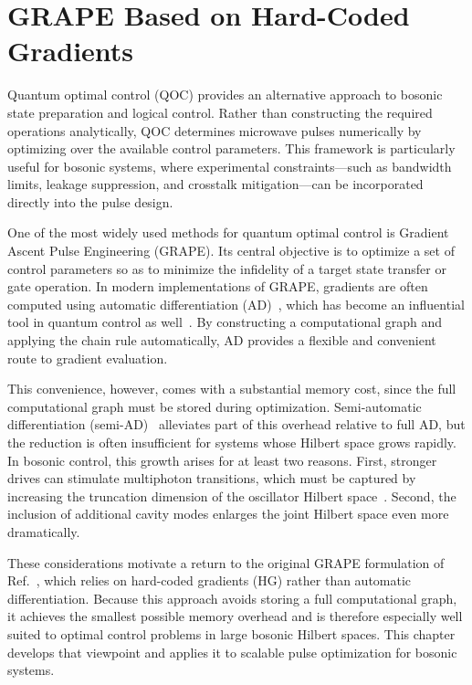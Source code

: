 \chapter{GRAPE Based on Hard-Coded Gradients}
\label{chap:grape}
Quantum optimal control (QOC) provides an alternative approach to bosonic state preparation and logical control. Rather than constructing the required operations analytically, QOC determines microwave pulses numerically by optimizing over the available control parameters. This framework is particularly useful for bosonic systems, where experimental constraints---such as bandwidth limits, leakage suppression, and crosstalk mitigation---can be incorporated directly into the pulse design.

One of the most widely used methods for quantum optimal control is Gradient Ascent Pulse Engineering (GRAPE).%
Its central objective is to optimize a set of control parameters so as to minimize the infidelity of a target state transfer or gate operation. In modern implementations of GRAPE, gradients are often computed using automatic differentiation (AD)~\cite{baydin2018automatic}, which has become an influential tool in quantum control as well~\cite{pacleung2017speedup,pacqoc,abdelhafez2019gradient,grapead}. By constructing a computational graph and applying the chain rule automatically, AD provides a flexible and convenient route to gradient evaluation.

This convenience, however, comes with a substantial memory cost, since the full computational graph must be stored during optimization. Semi-automatic differentiation (semi-AD)~\cite{semiadgoerz2022quantum} alleviates part of this overhead relative to full AD, but the reduction is often insufficient for systems whose Hilbert space grows rapidly. In bosonic control, this growth arises for at least two reasons. First, stronger drives can stimulate multiphoton transitions, which must be captured by increasing the truncation dimension of the oscillator Hilbert space~\cite{Dumas2024}. Second, the inclusion of additional cavity modes enlarges the joint Hilbert space even more dramatically.

These considerations motivate a return to the original GRAPE formulation of Ref.~\cite{nmrkhaneja2005optimal}, which relies on hard-coded gradients (HG) rather than automatic differentiation. Because this approach avoids storing a full computational graph, it achieves the smallest possible memory overhead and is therefore especially well suited to optimal control problems in large bosonic Hilbert spaces. This chapter develops that viewpoint and applies it to scalable pulse optimization for bosonic systems.

